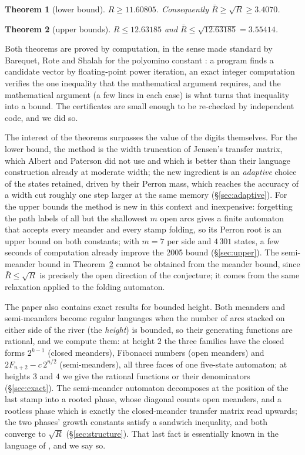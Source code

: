 \documentclass[11pt]{amsart}
\newtheorem{theorem}{Theorem}[section]
\theoremstyle{definition}
\newcommand{\Rb}{\bar R}
\begin{document}
\begin{theorem}[lower bound]\label{thm:lower}
$R\ge 11.60805$. Consequently $\Rb\ge\sqrt R\ge 3.4070$.
\end{theorem}

\begin{theorem}[upper bounds]\label{thm:upper}
$R\le 12.63185$ and $\Rb\le\sqrt{12.63185}=3.55414$.
\end{theorem}

Both theorems are proved by computation, in the sense made standard by Barequet, Rote and Shalah for the polyomino constant \cite{BRS}: a program finds a candidate vector by floating-point power iteration, an exact integer computation verifies the one inequality that the mathematical argument requires, and the mathematical argument (a few lines in each case) is what turns that inequality into a bound. The certificates are small enough to be re-checked by independent code, and we did so.

The interest of the theorems surpasses the value of the digits themselves. For the lower bound, the method is the width truncation of Jensen's transfer matrix, which Albert and Paterson did not use and which is better than their language construction already at moderate width; the new ingredient is an \emph{adaptive} choice of the states retained, driven by their Perron mass, which reaches the accuracy of a width cut roughly one step larger at the same memory (\S\ref{sec:adaptive}). For the upper bounds the method is new in this context and inexpensive: forgetting the path labels of all but the shallowest $m$ open arcs gives a finite automaton that accepts every meander and every stamp folding, so its Perron root is an upper bound on both constants; with $m=7$ per side and $4\,301$ states, a few seconds of computation already improve the 2005 bound (\S\ref{sec:upper}). The semi-meander bound in Theorem~\ref{thm:upper} cannot be obtained from the meander bound, since $\Rb\le\sqrt R$ is precisely the open direction of the conjecture; it comes from the same relaxation applied to the folding automaton.

The paper also contains exact results for bounded height. Both meanders and semi-meanders become regular languages when the number of arcs stacked on either side of the river (the \emph{height}) is bounded, so their generating functions are rational, and we compute them: at height $2$ the three families have the closed forms $2^{k-1}$ (closed meanders), Fibonacci numbers (open meanders) and $2F_{n+2}-c\,2^{n/2}$ (semi-meanders), all three faces of one five-state automaton; at heights $3$ and $4$ we give the rational functions or their denominators (\S\ref{sec:exact}). The semi-meander automaton decomposes at the position of the last stamp into a rooted phase, whose diagonal counts open meanders, and a rootless phase which is exactly the closed-meander transfer matrix read upwards; the two phases' growth constants satisfy a sandwich inequality, and both converge to $\sqrt R$ (\S\ref{sec:structure}). That last fact is essentially known in the language of \cite{DFGG96}, and we say so.
\end{document}
